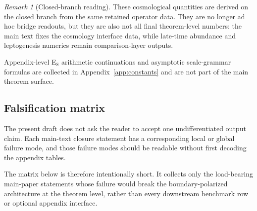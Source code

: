 \documentclass[11pt,a4paper]{article}
\theoremstyle{definition}
\theoremstyle{remark}
\newtheorem*{remark}{Remark}
\begin{document}
\begin{remark}[Closed-branch reading]
These cosmological quantities are derived on the closed branch from the same retained operator
data. They are no longer ad hoc bridge readouts, but they are also not all final theorem-level
numbers: the main text fixes the cosmology interface data, while late-time abundance and
leptogenesis numerics remain comparison-layer outputs.
\end{remark}

Appendix-level E$_8$ arithmetic continuations and asymptotic scale-grammar formulas are collected
in Appendix~\ref{app:constants} and are not part of the main theorem surface.

\subsection{Falsification matrix}

The present draft does not ask the reader to accept one undifferentiated output claim. Each
main-text closure statement has a corresponding local or global failure mode, and those failure
modes should be readable without first decoding the appendix tables.

The matrix below is therefore intentionally short. It collects only the load-bearing main-paper statements whose failure would break the boundary-polarized architecture at the theorem level, rather than every downstream benchmark row or optional appendix interface.
\end{document}
